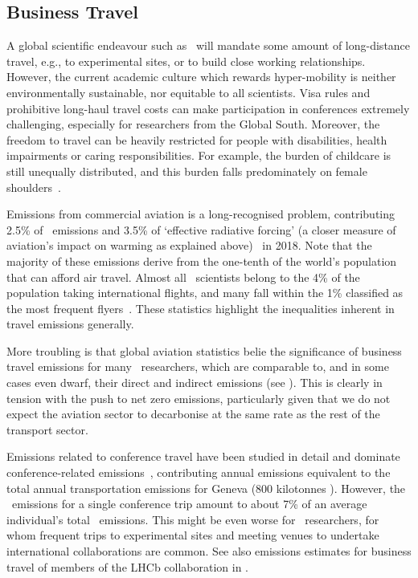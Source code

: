\documentclass[../SustainableHEP.tex]{subfiles}
\begin{document}
\subsection{Business Travel}

A global scientific endeavour such as \ACR\ will mandate some amount of long-distance travel, e.g., to experimental sites, or to build close working relationships.  However, the current academic culture which rewards hyper-mobility is neither environmentally sustainable, nor equitable to all scientists.  Visa rules and prohibitive long-haul travel costs can make participation in conferences extremely challenging, especially for researchers from the Global South. Moreover, the freedom to travel can be heavily restricted for people with disabilities, health impairments or caring responsibilities. For example, the burden of childcare is still unequally distributed, and this burden falls predominately on female shoulders~\cite{McCarthy}.

Emissions from commercial aviation is a long-recognised problem, contributing 2.5\% of \CdO\ emissions and 3.5\% of ‘effective radiative forcing’ (a closer measure of aviation's impact on warming as explained above)~\cite{Rit20} in 2018.  Note that the majority of these emissions derive from the one-tenth of the world’s population that can afford air travel.  Almost all \ACR\ scientists belong to the 4\% of the population taking international flights, and many fall within the 1\% classified as the most frequent flyers~\cite{GOSSLING2020102194}.  These statistics highlight the inequalities inherent in travel emissions generally.

More troubling is that global aviation statistics belie the significance of business travel emissions for many \ACR\ researchers, which are comparable to, and in some cases even dwarf, their direct and indirect emissions (see ).  This is clearly in tension with the push to net zero emissions, particularly given that we do not expect the aviation sector to decarbonise at the same rate as the rest of the transport sector.

Emissions related to conference travel have been studied in detail and dominate conference-related emissions~\cite{Spinellis, nature_better_confs}, contributing annual emissions equivalent to the total annual transportation emissions for Geneva (800 kilotonnes \CdO).  However, the \CdO\ emissions for a single conference trip amount to about 7\% of an average individual’s total \CdO\ emissions. This might be even worse for \ACR\ researchers, for whom frequent trips to experimental sites and meeting venues to undertake international collaborations are common.  See also emissions estimates for business travel of members of the LHCb collaboration in .
\end{document}
